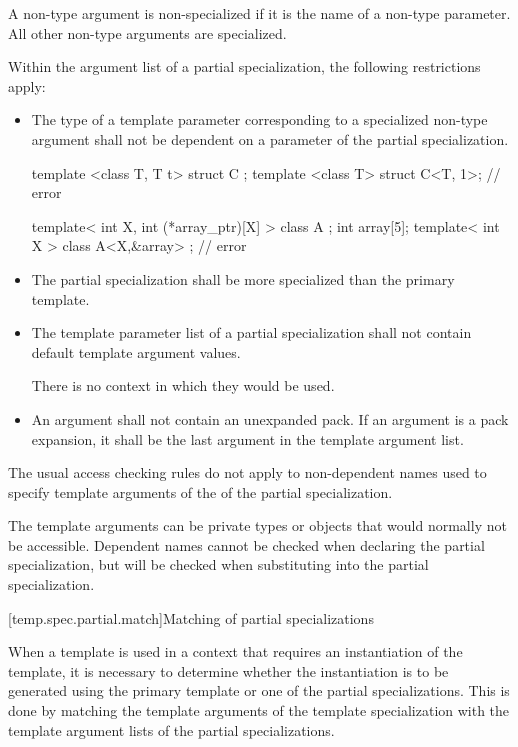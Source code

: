 \pnum
A non-type argument is non-specialized if it is the name of a non-type
parameter.
All other non-type arguments are specialized.

\pnum
Within the argument list of a partial specialization,
the following restrictions apply:
\begin{itemize}
\item
The type of a template parameter corresponding to a specialized non-type argument
shall not be dependent on a parameter of the partial specialization.
\begin{example}
\begin{codeblock}
template <class T, T t> struct C {};
template <class T> struct C<T, 1>;              // error

template< int X, int (*array_ptr)[X] > class A {};
int array[5];
template< int X > class A<X,&array> { };        // error
\end{codeblock}
\end{example}
\item
The partial specialization shall be more specialized than the primary
template.

\item
The template parameter list of a partial specialization shall not contain default
template argument values.
\begin{footnote}
There is no context in which they would be used.
\end{footnote}
\item
An argument shall not contain an unexpanded pack. If
an argument is a pack expansion, it shall be
the last argument in the template argument list.
\end{itemize}

\pnum
The usual access checking rules do not apply to non-dependent names
used to specify template arguments of the 
of the partial specialization.
\begin{note}
The template arguments can be private types or
objects that would normally not be accessible.
Dependent names cannot be checked when declaring the partial specialization,
but will be checked when substituting into the partial specialization.
\end{note}

[temp.spec.partial.match]{Matching of partial specializations}

\pnum
When a template is used in a context that requires an instantiation of
the template,
it is necessary to determine whether the instantiation is to be generated
using the primary template or one of the partial specializations.
This is done by matching the template arguments of the template
specialization with the template argument lists of the partial
specializations.

